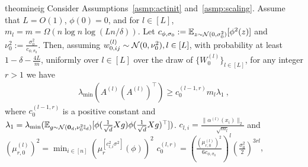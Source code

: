 %
\begin{restatable}{theo}{mineig}
Consider Assumptions~\ref{asmp:actinit} and~\ref{asmp:scaling}. Assume that $L=O(1)$,  $\phi(0)=0$, and for $l \in [L]$, 
$m_{l}  = m = \Omega( n \log n  \log (Ln/\delta))$.  
Let $c_{\phi,\sigma_0} := \mathbb{E}_{z \sim {\cal N}(0,\sigma_0^2)}[\phi^2(z)]$ and $\nu_0^2 := \frac{\sigma_0^2}{c_{\phi,\sigma_0}}$. Then, assuming $w^{(l)}_{0,ij} \sim {\cal N}(0,\nu_0^2), l \in [L]$, with probability at least $1- \delta - \frac{4L}{m}$, uniformly over $l \in [L]$ over the draw of $\{W_0^{(l)}\}_{l\in[L]}$, for any integer $r > 1$ we have
\begin{align*}
\lambda_{\min}( A^{(l)} (A^{(l)})^\top ) \geq c_0^{(l-1,r)} m_l \lambda_1~,
\end{align*}
where $c_0^{(l-1,r)}$ is a positive constant and $\lambda_1 = \lambda_{\min}(\mathbb{E}_{g \sim
{\cal N}(\bm{0}_{d},\nu^2_0 \mathbb{I}_{d})
}[ \phi(\frac{1}{\sqrt{d}} X g) \phi(\frac{1}{\sqrt{d}} X g)^\top])$. 
 $c_{l,i} = \frac{\| \alpha^{(l)}(x_i) \|_2}{\sqrt{m_l}}$ and $(\mu_{r,0}^{(l)})^2 = \min_{i \in [n]} \left( \mu_r^{[c_{l,i}^2 \sigma^2]} (\phi) \right)^2$   
$c_0^{(l,r)} = \left( \frac{(\mu_{r,0}^{(l)})^2}{6 c_{\phi,\sigma_0}} \right)^l \left( \frac{\sigma_0^2}{2} \right)^{3rl}$, 
%
\label{theo:mineig}
\end{restatable}


